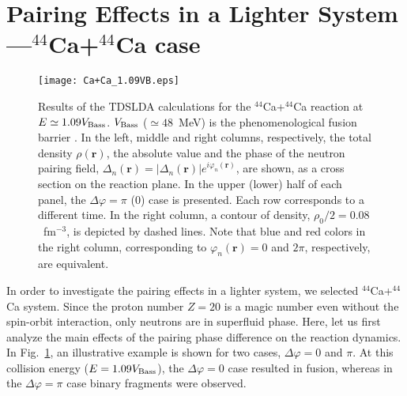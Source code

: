 \documentclass{PoS}
\def\bs#1{\boldsymbol{#1}}
\begin{document}
\section{Pairing Effects in a Lighter System---$^{44}$Ca+$^{44}$Ca case}{\label{sec:results}}

\begin{figure}[t]
\begin{center}
\texttt{[image: Ca+Ca\_1.09VB.eps]}
\end{center}\vspace{-3mm}
\caption{
Results of the TDSLDA calculations for the $^{44}$Ca+$^{44}$Ca reaction
at $E \simeq 1.09V_{\rm Bass}$. $V_{\rm Bass}$ ($\simeq 48$~MeV) is
the phenomenological fusion barrier \cite{Bass(1974)}. In the left, middle
and right columns, respectively, the total density $\rho(\bs{r})$, the absolute
value and the phase of the neutron pairing field, $\Delta_n(\bs{r})=|\Delta_n(\bs{r})|
e^{i\varphi_n(\bs{r})}$, are shown, as a cross section on the reaction plane.
In the upper (lower) half of each panel, the $\Delta\varphi=\pi$ (0) case
is presented. Each row corresponds to a different time. In the right column,
a contour of density, $\rho_0/2=0.08$~fm$^{-3}$, is depicted by dashed
lines. Note that blue and red colors in the right column, corresponding to
$\varphi_n(\bs{r})=0$ and $2\pi$, respectively, are equivalent.
}
\label{FIG:Ca+Ca}
\end{figure}

In order to investigate the pairing effects in a lighter system, we selected
$^{44}$Ca+$^{44}$Ca system. Since the proton number $Z=20$ is a magic
number even without the spin-orbit interaction, only neutrons are in superfluid
phase. Here, let us first analyze the main effects of the pairing phase difference
on the reaction dynamics. In Fig.~\ref{FIG:Ca+Ca}, an illustrative example
is shown for two cases, $\Delta\varphi=0$ and $\pi$. At this collision energy
($E=1.09V_{\rm Bass}$), the $\Delta\varphi=0$ case resulted in fusion,
whereas in the $\Delta\varphi=\pi$ case binary fragments were observed.
\end{document}
